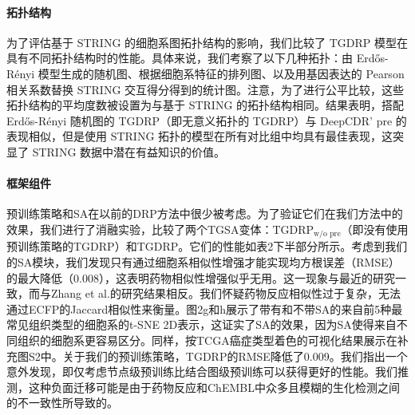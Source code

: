\paragraph{拓扑结构}
为了评估基于 STRING 的细胞系图拓扑结构的影响，我们比较了 TGDRP 模型在具有不同拓扑结构时的性能。具体来说，我们考察了以下几种拓扑：由 Erdős-Rényi 模型生成的随机图\cite{Erdos1960}、根据细胞系特征的排列图、以及用基因表达的 Pearson 相关系数替换 STRING 交互得分得到的统计图。注意，为了进行公平比较，这些拓扑结构的平均度数被设置为与基于 STRING 的拓扑结构相同。结果表明，搭配 Erdős-Rényi 随机图的 TGDRP（即无意义拓扑的 TGDRP）与 DeepCDR' pre 的表现相似，但是使用 STRING 拓扑的模型在所有对比组中均具有最佳表现，这突显了 STRING 数据中潜在有益知识的价值。

\paragraph{框架组件}
预训练策略和SA在以前的DRP方法中很少被考虑。为了验证它们在我们方法中的效果，我们进行了消融实验，比较了两个TGSA变体：$ \text{TGDRP}_{\text{w/o pre}} $（即没有使用预训练策略的TGDRP）和TGDRP。它们的性能如表2下半部分所示。考虑到我们的SA模块，我们发现只有通过细胞系相似性增强才能实现均方根误差（RMSE）的最大降低（0.008），这表明药物相似性增强似乎无用。这一现象与最近的研究\cite{Wang2017}一致，而与Zhang et al.的研究结果相反\cite{Zhang2015}。我们怀疑药物反应相似性过于复杂，无法通过ECFP的Jaccard相似性来衡量。图2g和h展示了带有和不带SA的来自前5种最常见组织类型的细胞系的t-SNE\cite{vanderMaaten2008} 2D表示，这证实了SA的效果，因为SA使得来自不同组织的细胞系更容易区分。同样，按TCGA癌症类型着色的可视化结果展示在补充图S2中。关于我们的预训练策略，TGDRP的RMSE降低了0.009。我们指出一个意外发现，即仅考虑节点级预训练比结合图级预训练可以获得更好的性能。我们推测，这种负面迁移可能是由于药物反应和ChEMBL中众多且模糊的生化检测之间的不一致性所导致的。


